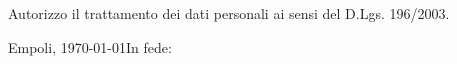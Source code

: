 \documentclass[11pt,a4paper,nolmodern]{moderncv}
\begin{document}




%


\tiny\vspace{\fill}
\footnotesize\noindent\centering
Autorizzo il trattamento dei dati personali ai sensi del D.Lgs. 196/2003.

Empoli, \today\hfill  In fede:

\vfill
\end{document}
